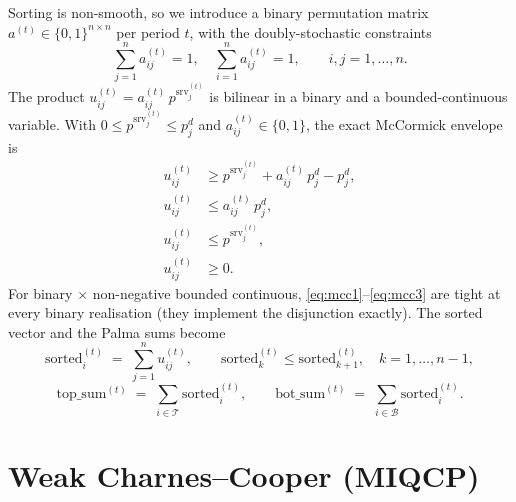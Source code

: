 \documentclass[11pt]{article}
\newcommand{\pserved}{p^{\mathrm{srv}}}
\newcommand{\Top}{\mathcal{T}}
\newcommand{\Bot}{\mathcal{B}}
\begin{document}
Sorting is non-smooth, so we introduce a binary permutation matrix
$a^{(t)} \in \{0,1\}^{n\times n}$ per period $t$, with the doubly-stochastic
constraints
\begin{equation}\label{eq:dstoch}
    \sum_{j=1}^{n} a^{(t)}_{ij} = 1, \quad
    \sum_{i=1}^{n} a^{(t)}_{ij} = 1, \qquad i,j = 1,\dots,n.
\end{equation}
The product $u^{(t)}_{ij} = a^{(t)}_{ij}\,\pserved^{(t)}_{j}$ is bilinear in a
binary and a bounded-continuous variable. With
$0 \le \pserved^{(t)}_{j} \le p^{d}_{j}$ and $a^{(t)}_{ij} \in \{0,1\}$, the
exact McCormick envelope is
\begin{align}
    u^{(t)}_{ij} &\ge \pserved^{(t)}_{j} + a^{(t)}_{ij}\,p^{d}_{j} - p^{d}_{j}, \label{eq:mcc1}\\
    u^{(t)}_{ij} &\le a^{(t)}_{ij}\,p^{d}_{j}, \label{eq:mcc2}\\
    u^{(t)}_{ij} &\le \pserved^{(t)}_{j}, \label{eq:mcc3}\\
    u^{(t)}_{ij} &\ge 0.
\end{align}
For binary $\times$ non-negative bounded continuous, \eqref{eq:mcc1}--\eqref{eq:mcc3}
are tight at every binary realisation (they implement the disjunction exactly).
The sorted vector and the Palma sums become
\begin{equation}\label{eq:sorted}
    \mathrm{sorted}^{(t)}_{i} \;=\; \sum_{j=1}^{n} u^{(t)}_{ij},
    \qquad
    \mathrm{sorted}^{(t)}_{k} \le \mathrm{sorted}^{(t)}_{k+1}, \quad k = 1,\dots,n-1,
\end{equation}
\begin{equation}\label{eq:sums}
    \mathrm{top\_sum}^{(t)} \;=\; \sum_{i\in\Top} \mathrm{sorted}^{(t)}_{i},
    \qquad
    \mathrm{bot\_sum}^{(t)} \;=\; \sum_{i\in\Bot} \mathrm{sorted}^{(t)}_{i}.
\end{equation}

\section{Weak Charnes--Cooper (MIQCP)}\label{sec:weak}
\end{document}
